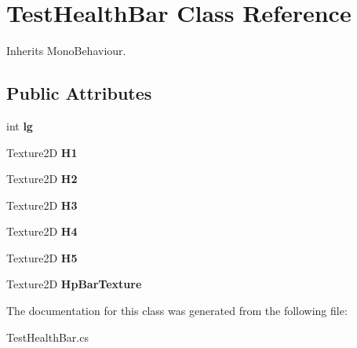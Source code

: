 \hypertarget{class_test_health_bar}{\section{Test\+Health\+Bar Class Reference}
\label{class_test_health_bar}
}


Inherits Mono\+Behaviour.

\subsection*{Public Attributes}
\begin{DoxyCompactItemize}
\item 
\hypertarget{class_test_health_bar_ab2e0e4cb8216976bf21671ccf95cb63f}{int {\bfseries lg}}\label{class_test_health_bar_ab2e0e4cb8216976bf21671ccf95cb63f}

\item 
\hypertarget{class_test_health_bar_acc49d8f6f65c89fec3d2d1e60a27fcff}{Texture2\+D {\bfseries H1}}\label{class_test_health_bar_acc49d8f6f65c89fec3d2d1e60a27fcff}

\item 
\hypertarget{class_test_health_bar_a5714bd2e9f4fdb0a8a355f7f98c13b8f}{Texture2\+D {\bfseries H2}}\label{class_test_health_bar_a5714bd2e9f4fdb0a8a355f7f98c13b8f}

\item 
\hypertarget{class_test_health_bar_a85dce77ae1e4d226bfd46857c23f9b18}{Texture2\+D {\bfseries H3}}\label{class_test_health_bar_a85dce77ae1e4d226bfd46857c23f9b18}

\item 
\hypertarget{class_test_health_bar_a15e2da0250f6c8a2536821abbe59f2ff}{Texture2\+D {\bfseries H4}}\label{class_test_health_bar_a15e2da0250f6c8a2536821abbe59f2ff}

\item 
\hypertarget{class_test_health_bar_a4f5b8251043125514914d429efe6e718}{Texture2\+D {\bfseries H5}}\label{class_test_health_bar_a4f5b8251043125514914d429efe6e718}

\item 
\hypertarget{class_test_health_bar_a9d7ab572326dfbd67315dc7be067ad7c}{Texture2\+D {\bfseries Hp\+Bar\+Texture}}\label{class_test_health_bar_a9d7ab572326dfbd67315dc7be067ad7c}

\end{DoxyCompactItemize}


The documentation for this class was generated from the following file\+:\begin{DoxyCompactItemize}
\item 
Test\+Health\+Bar.\+cs\end{DoxyCompactItemize}
